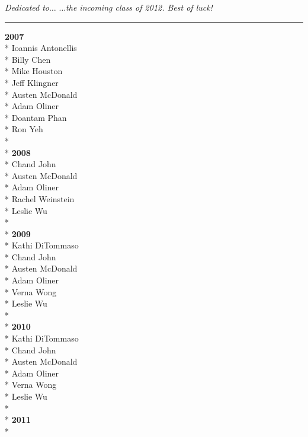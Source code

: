 \documentclass[10pt]{book}
\begin{document}
\thispagestyle{empty}
{\Large\it Dedicated to$\ldots$}
\vskip 0pt
{\it\hspace{.5in} $\ldots$the incoming class of 2012. Best of luck!}
\newpage

\mbox{}
\thispagestyle{empty}
\newpage

\vskip0pt
\rule[8pt]{\linewidth}{.5pt}
{\bf 2007}\\*
Ioannis Antonellis\\*
Billy Chen\\*
Mike Houston\\*
Jeff Klingner\\*
Austen McDonald\\*
Adam Oliner\\*
Doantam Phan\\*
Ron Yeh\\*
\vspace{0.2in}\\*
{\bf 2008}\\*
Chand John\\*
Austen McDonald\\*
Adam Oliner\\*
Rachel Weinstein\\*
Leslie Wu\\*
\vspace{0.2in}\\*
{\bf 2009}\\*
Kathi DiTommaso\\*
Chand John\\*
Austen McDonald\\*
Adam Oliner\\*
Verna Wong\\*
Leslie Wu\\*
\vspace{0.2in}\\*
{\bf 2010}\\*
Kathi DiTommaso\\*
Chand John\\*
Austen McDonald\\*
Adam Oliner\\*
Verna Wong\\*
Leslie Wu\\*
\vspace{0.2in}\\*
{\bf 2011}\\*
\end{document}
